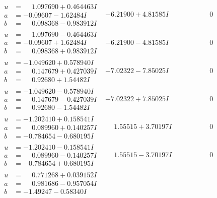 \documentclass[1p]{elsarticle_modified}
\theoremstyle{definition}
\begin{document}
$$\begin{array}{c|c|c}
\begin{aligned}
u &= \phantom{-}1.097690 + 0.464463 I \\
a &= -0.09607 - 1.62484 I \\
b &= \phantom{-}0.098368 - 0.983912 I\end{aligned}
 & -6.21900 + 4.81585 I & \phantom{-0.000000 } 0 \\ \hline\begin{aligned}
u &= \phantom{-}1.097690 - 0.464463 I \\
a &= -0.09607 + 1.62484 I \\
b &= \phantom{-}0.098368 + 0.983912 I\end{aligned}
 & -6.21900 - 4.81585 I & \phantom{-0.000000 } 0 \\ \hline\begin{aligned}
u &= -1.049620 + 0.578940 I \\
a &= \phantom{-}0.147679 + 0.427039 I \\
b &= \phantom{-}0.92680 + 1.54482 I\end{aligned}
 & -7.02322 - 7.85025 I & \phantom{-0.000000 } 0 \\ \hline\begin{aligned}
u &= -1.049620 - 0.578940 I \\
a &= \phantom{-}0.147679 - 0.427039 I \\
b &= \phantom{-}0.92680 - 1.54482 I\end{aligned}
 & -7.02322 + 7.85025 I & \phantom{-0.000000 } 0 \\ \hline\begin{aligned}
u &= -1.202410 + 0.158541 I \\
a &= \phantom{-}0.089960 + 0.140257 I \\
b &= -0.784654 - 0.680195 I\end{aligned}
 & \phantom{-}1.55515 + 3.70197 I & \phantom{-0.000000 } 0 \\ \hline\begin{aligned}
u &= -1.202410 - 0.158541 I \\
a &= \phantom{-}0.089960 - 0.140257 I \\
b &= -0.784654 + 0.680195 I\end{aligned}
 & \phantom{-}1.55515 - 3.70197 I & \phantom{-0.000000 } 0 \\ \hline\begin{aligned}
u &= \phantom{-}0.771268 + 0.039152 I \\
a &= \phantom{-}0.981686 - 0.957054 I \\
b &= -1.49247 - 0.58340 I\end{aligned}

\end{array}$$
\end{document}
